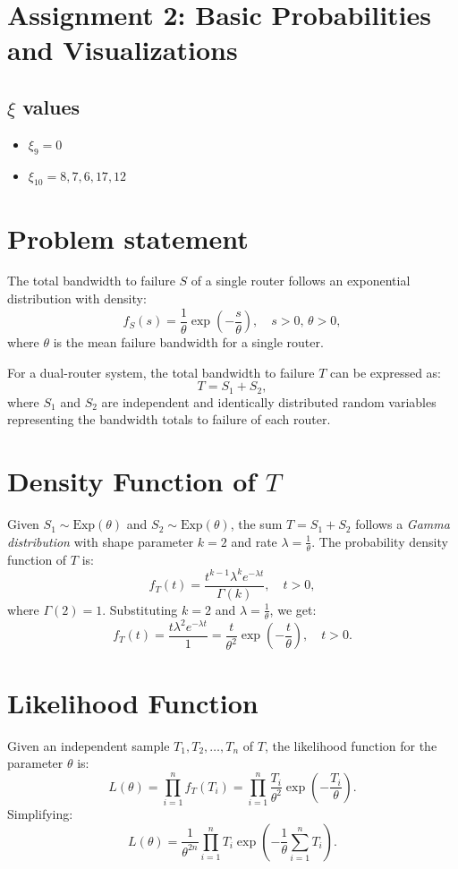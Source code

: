 \section{Assignment 2: Basic Probabilities and Visualizations}

\subsection{$\xi$ values}

\begin{itemize}
    \item $\xi_9 = 0$
    \item $\xi_10 = 8,7,6,17,12$
\end{itemize}



\section{Problem statement}
The total bandwidth to failure \( S \) of a single router follows an exponential distribution with density:
\[
f_S(s) = \frac{1}{\theta} \exp\left(-\frac{s}{\theta}\right), \quad s > 0, \, \theta > 0,
\]
where \( \theta \) is the mean failure bandwidth for a single router.

For a dual-router system, the total bandwidth to failure \( T \) can be expressed as:
\[
T = S_1 + S_2,
\]
where \( S_1 \) and \( S_2 \) are independent and identically distributed random variables representing the bandwidth totals to failure of each router.

\section{Density Function of \( T \)}
Given \( S_1 \sim \text{Exp}(\theta) \) and \( S_2 \sim \text{Exp}(\theta) \), the sum \( T = S_1 + S_2 \) follows a \emph{Gamma distribution} with shape parameter \( k = 2 \) and rate \( \lambda = \frac{1}{\theta} \). The probability density function of \( T \) is:
\[
f_T(t) = \frac{t^{k-1} \lambda^k e^{-\lambda t}}{\Gamma(k)}, \quad t > 0,
\]
where \( \Gamma(2) = 1 \). Substituting \( k = 2 \) and \( \lambda = \frac{1}{\theta} \), we get:
\[
f_T(t) = \frac{t \lambda^2 e^{-\lambda t}}{1} = \frac{t}{\theta^2} \exp\left(-\frac{t}{\theta}\right), \quad t > 0.
\]

\section{Likelihood Function}
Given an independent sample \( T_1, T_2, \dots, T_n \) of \( T \), the likelihood function for the parameter \( \theta \) is:
\[
L(\theta) = \prod_{i=1}^n f_T(T_i) = \prod_{i=1}^n \frac{T_i}{\theta^2} \exp\left(-\frac{T_i}{\theta}\right).
\]
Simplifying:
\[
L(\theta) = \frac{1}{\theta^{2n}} \prod_{i=1}^n T_i \exp\left(-\frac{1}{\theta} \sum_{i=1}^n T_i\right).
\]

